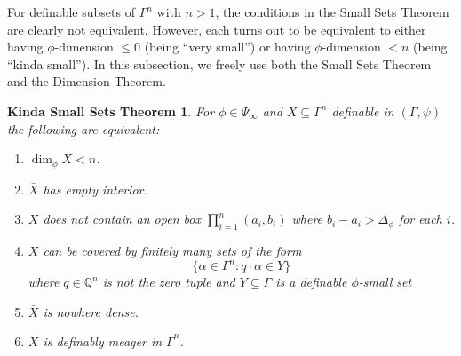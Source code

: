 \documentclass[11pt]{amsart}
\theoremstyle{plain}
\newtheorem{kindaSmallSetsTheorem}[thm]{Kinda Small Sets Theorem}
\theoremstyle{definition}
\numberwithin{equation}{section}
\newcommand\Q{\mathbb{Q}}
\newcommand\0{\varnothing}
\begin{document}
For definable subsets of $\Gamma^n$ with $n>1$, the conditions in the Small Sets Theorem are clearly not equivalent. However, each turns out to be equivalent to either having $\phi$-dimension $\leq 0$ (being ``very small'') or having $\phi$-dimension $< n$ (being ``kinda small''). In this subsection, we freely use both the Small Sets Theorem and the Dimension Theorem. 


\begin{kindaSmallSetsTheorem}\label{smallishsets}
For $\phi\in\Psi_{\infty}$ and $X\subseteq\Gamma^n$ definable in $(\Gamma,\psi)$ the following are equivalent:
\begin{enumerate}
\item\label{ksmallequiv1} $\dim_{\phi} X<n$.
\item\label{ksmallequiv2} $\bar{X}$ has empty interior.
\item\label{ksmallequiv3} $X$ does not contain an open box $\prod_{i=1}^n(a_i,b_i)$ where $b_i-a_i>\Delta_{\phi}$ for each $i$.
\item\label{ksmallequiv4} $X$ can be covered by finitely many sets of the form 
\[
\{\alpha \in \Gamma^n:q\cdot \alpha \in Y\}
\]
where $q \in \Q^n$ is not the zero tuple and $Y \subseteq \Gamma$ is a definable $\phi$-small set \item\label{ksmallequiv5} $\bar{X}$ is nowhere dense.
\item\label{ksmallequiv6} $\bar{X}$ is definably meager in $\bar{\Gamma}^n$.
\end{enumerate}
\end{kindaSmallSetsTheorem}
\end{document}
